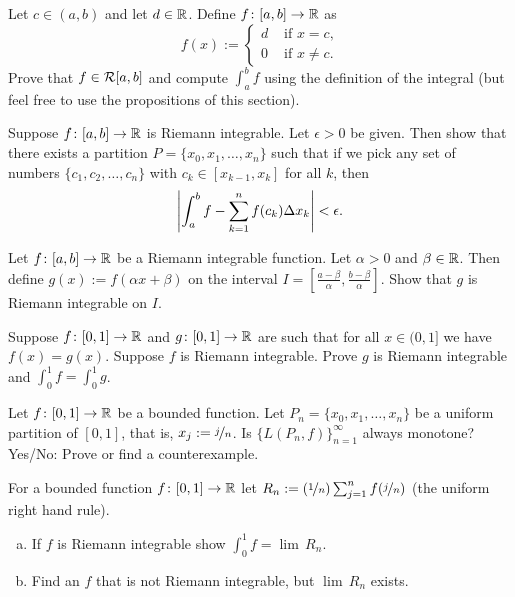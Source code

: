 \begin{exercise}
Let $c \in (a,b)$ and let $d \in {\mathbb{R}}$.
Define $f \colon [a,b] \to {\mathbb{R}}$ as
\begin{equation*}
f(x) :=
\begin{cases}
d & \text{ if $x = c$,} \\
0 & \text{ if $x \not= c$.}
\end{cases}
\end{equation*}
Prove that $f \in {\mathcal{R}}[a,b]$ and
compute
$\int_a^b f$ using the definition of the integral
(but
feel free to use the propositions of this section).
\end{exercise}

\begin{exercise} \label{exercise:taggedpartition}
Suppose $f \colon [a,b] \to {\mathbb{R}}$ is Riemann integrable.  Let $\epsilon
> 0$ be given.  Then show that there exists a partition $P = \{ x_0, x_1,
\ldots, x_n \}$
such that if we
pick any set of numbers $\{ c_1, c_2, \ldots, c_n \}$ with
$c_k \in [x_{k-1},x_k]$ for all $k$, then
\begin{equation*}
\left\lvert {\int_a^b f - \sum_{k=1}^n f(c_k) \Delta x_k} \right\rvert < \epsilon .
\end{equation*}
\end{exercise}

\begin{exercise}
Let $f \colon [a,b] \to {\mathbb{R}}$ be a Riemann integrable function.
Let $\alpha > 0$ and $\beta \in {\mathbb{R}}$.
Then define $g(x) := f(\alpha x + \beta)$ on the interval
$I = [\frac{a-\beta}{\alpha}, \frac{b-\beta}{\alpha}]$.  Show
that $g$ is Riemann integrable on $I$.
\end{exercise}

\begin{exercise}
Suppose $f \colon [0,1] \to {\mathbb{R}}$ and $g \colon [0,1] \to {\mathbb{R}}$
are such that for all $x \in (0,1]$
we have $f(x) = g(x)$.  Suppose $f$ is Riemann integrable. 
Prove $g$ is Riemann integrable and $\int_{0}^1 f = \int_{0}^1 g$.
\end{exercise}

\begin{exercise}
Let $f \colon [0,1] \to {\mathbb{R}}$ be a bounded function.
Let $P_n = \{ x_0,x_1,\ldots,x_n \}$ be a uniform partition of $[0,1]$,
that is, $x_j := \nicefrac{j}{n}$.  Is $\{ L(P_n,f) \}_{n=1}^\infty$
always monotone?  Yes/No: Prove or find a counterexample.
\end{exercise}

\begin{exercise}[Challenging]
For a bounded function $f \colon [0,1] \to {\mathbb{R}}$ let
$R_n := (\nicefrac{1}{n})\sum_{j=1}^n f(\nicefrac{j}{n})$ (the
uniform right hand rule).
\begin{enumerate}[a)]
\item
If $f$ is Riemann integrable show $\int_0^1 f = \lim \, R_n$.
\item
Find an $f$ that is not Riemann integrable, but $\lim \, R_n$ exists.
\end{enumerate}
\end{exercise}


